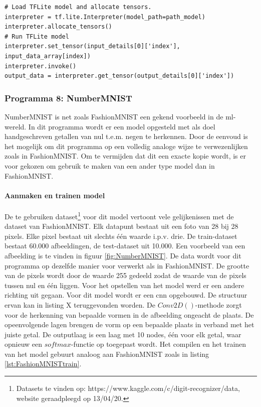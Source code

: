 	\begin{lstlisting}[caption={Runnen van sequentieel model voor FashionMNIST.}, captionpos=b,label={lst:FashionMNISTrun}]
# Load TFLite model and allocate tensors.
interpreter = tf.lite.Interpreter(model_path=path_model)
interpreter.allocate_tensors()
# Run TFLite model
interpreter.set_tensor(input_details[0]['index'], input_data_array[index])
interpreter.invoke()
output_data = interpreter.get_tensor(output_details[0]['index'])
	\end{lstlisting}				

		\subsubsection{Programma 8: NumberMNIST}
		NumberMNIST is net zoals FashionMNIST een gekend voorbeeld in de \gls{ml}-wereld. In dit programma wordt er een model opgesteld met als doel handgeschreven getallen van nul t.e.m. negen te herkennen. Door de eenvoud is het mogelijk om dit programma op een volledig analoge wijze te verwezenlijken zoals in FashionMNIST. Om te vermijden dat dit een exacte kopie wordt, is er voor gekozen om gebruik te maken van een ander type model dan in FashionMNIST.
				
			\paragraph{Aanmaken en trainen model}
			De te gebruiken dataset\footnote{Datasets te vinden op: https://www.kaggle.com/c/digit-recognizer/data, website geraadpleegd op 13/04/20.} voor dit model vertoont vele gelijkenissen met de dataset van FashionMNIST. Elk datapunt bestaat uit een foto van 28 bij 28 pixels. Elke pixel bestaat uit slechts \'e\'en waarde i.p.v. drie. De train-dataset bestaat 60.000 afbeeldingen, de test-dataset uit 10.000. Een voorbeeld van een afbeelding is te vinden in figuur \ref{fig:NumberMNIST}. De data wordt voor dit programma op dezelfde manier voor verwerkt als in FashionMNIST. De grootte van de pixels wordt door de waarde 255 gedeeld zodat de waarde van de pixels tussen nul en \'e\'en liggen. Voor het opstellen van het model werd er een andere richting uit gegaan. Voor dit model wordt er een \gls{cnn} opgebouwd. De structuur ervan kan in listing X teruggevonden worden. De $Conv2D()$-methode zorgt voor de herkenning van bepaalde vormen in de afbeelding ongeacht de plaats. De opeenvolgende lagen brengen de vorm op een bepaalde plaats in verband met het juiste getal. De outputlaag is een laag met 10 nodes, \'e\'en voor elk getal, waar opnieuw een $softmax$-functie op toegepast wordt. Het compilen en het trainen van het model gebuurt analoog aan FashionMNIST zoals in listing \ref{lst:FashionMNISTtrain}.

